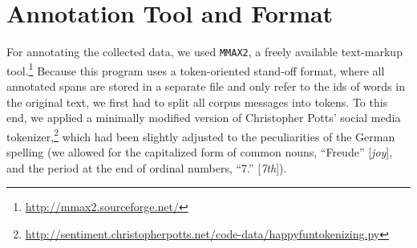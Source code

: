 \section{Annotation Tool and Format}\label{subsec:snt:tformat}

For annotating the collected data, we used \texttt{MMAX2}, a freely
available text-markup
tool.\footnote{\url{http://mmax2.sourceforge.net/}} Because this
program uses a token-oriented stand-off format, where all annotated
spans are stored in a separate file and only refer to the ids of words
in the original text, we first had to split all corpus messages into
tokens.  To this end, we applied a minimally modified version of
Christopher Potts' social media
tokenizer,\footnote{\url{http://sentiment.christopherpotts.net/code-data/happyfuntokenizing.py}}
which had been slightly adjusted to the peculiarities of the German
spelling (we allowed for the capitalized form of common nouns, \eg{}
``Freude'' [\emph{joy}], and the period at the end of ordinal numbers,
\eg{} ``7.''  [\emph{7th}]).


